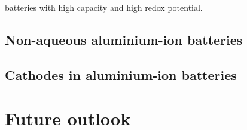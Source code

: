 batteries with high capacity and high redox potential.

\subsection{Non-aqueous aluminium-ion batteries}

\subsection{Cathodes in aluminium-ion batteries}
\section{Future outlook}